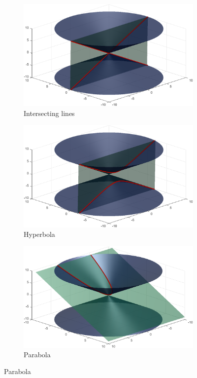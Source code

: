 \documentclass[fleqn]{LectureClass/LectureClass}
\begin{document}
\begin{figure}
        \begin{subfigure}{0.45\textwidth}
            \centering
            \includegraphics[width=\textwidth]{images/conic-sections-intersecting-lines}
            \caption{Intersecting lines}
        \end{subfigure}
        \begin{subfigure}{0.45\textwidth}
            \centering
            \includegraphics[width=\textwidth]{images/conic-sections-hyperbola}
            \caption{Hyperbola}
        \end{subfigure}
        
        \begin{subfigure}{0.7\textwidth}
            \centering
            \includegraphics[width=\textwidth]{images/conic-sections-parabola}
            \caption{Parabola}
        \end{subfigure}
        

\end{figure}
\end{document}
